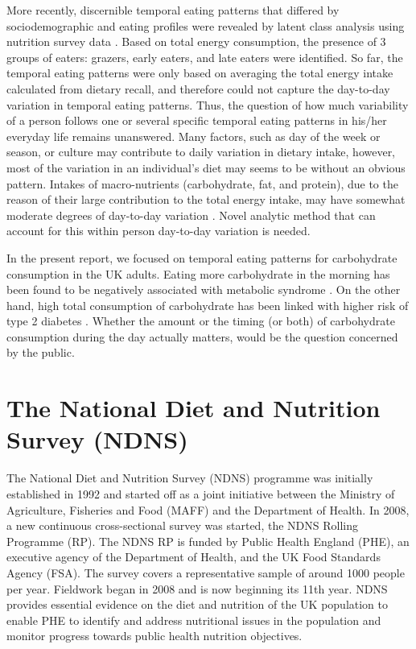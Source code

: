 More recently, discernible temporal eating patterns that differed by sociodemographic and eating profiles were revealed by latent class analysis using nutrition survey data \parencite{leech2017temporal, mansukhani2018investigating}. Based on total energy consumption, the presence of 3 groups of eaters: grazers, early eaters, and late eaters were identified. So far, the temporal eating patterns were only based on averaging the total energy intake calculated from dietary recall, and therefore could not capture the day-to-day variation in temporal eating patterns. Thus, the question of how much variability of a person follows one or several specific temporal eating patterns in his/her everyday life remains unanswered. Many factors, such as day of the week or season, or culture may contribute to daily variation in dietary intake, however, most of the variation in an individual's diet may seems to be without an obvious pattern. Intakes of macro-nutrients (carbohydrate, fat, and protein), due to the reason of their large contribution to the total energy intake, may have somewhat moderate degrees of day-to-day variation \parencite{willett2012nutritional}. Novel analytic method that can account for this within person day-to-day variation is needed. 

In the present report, we focused on temporal eating patterns for carbohydrate consumption in the UK adults. Eating more carbohydrate in the morning has been found to be negatively associated with metabolic syndrome \parencite{almoosawi2013time}. On the other hand, high total consumption of carbohydrate has been linked with higher risk of type 2 diabetes \parencite{alhazmi2012macronutrient}. Whether the amount or the timing (or both) of carbohydrate consumption during the day actually matters, would be the question concerned by the public. 




\section{The National Diet and Nutrition Survey (NDNS)}\vspace{-0.3cm}

The National Diet and Nutrition Survey (NDNS) programme \parencite{NDNSdatabase2018} was initially established in 1992 and started off as a joint initiative between the Ministry of Agriculture, Fisheries and Food (MAFF) and the Department of Health. In 2008, a new continuous cross-sectional survey was started, the NDNS Rolling Programme (RP). The NDNS RP is funded by Public Health England (PHE), an executive agency of the Department of Health, and the UK Food Standards Agency (FSA). The survey covers a representative sample of around 1000 people per year. Fieldwork began in 2008 and is now beginning its 11th year. NDNS provides essential evidence on the diet and nutrition of the UK population to enable PHE to identify and address nutritional issues in the population and monitor progress towards public health nutrition objectives.

